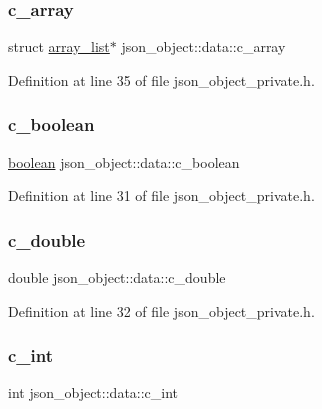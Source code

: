 \subsubsection{\texorpdfstring{c\+\_\+array}{c\_array}}
{\footnotesize\ttfamily struct \hyperlink{structarray__list}{array\+\_\+list}$\ast$ json\+\_\+object\+::data\+::c\+\_\+array}



Definition at line 35 of file json\+\_\+object\+\_\+private.\+h.

\mbox{\label{unionjson__object_1_1data_ace8860a384f47f7cbe7e656eb2632fc0}} 
\subsubsection{\texorpdfstring{c\+\_\+boolean}{c\_boolean}}
{\footnotesize\ttfamily \hyperlink{json__object_8h_a621c38f1f10a1c565d897e3178b16d6e}{boolean} json\+\_\+object\+::data\+::c\+\_\+boolean}



Definition at line 31 of file json\+\_\+object\+\_\+private.\+h.

\mbox{\label{unionjson__object_1_1data_a9cc4abdb21302913701ac0c8dc75e55a}} 
\subsubsection{\texorpdfstring{c\+\_\+double}{c\_double}}
{\footnotesize\ttfamily double json\+\_\+object\+::data\+::c\+\_\+double}



Definition at line 32 of file json\+\_\+object\+\_\+private.\+h.

\mbox{\label{unionjson__object_1_1data_a397c3575aeea167c47dff9594d1e4aab}} 
\subsubsection{\texorpdfstring{c\+\_\+int}{c\_int}}
{\footnotesize\ttfamily int json\+\_\+object\+::data\+::c\+\_\+int}



